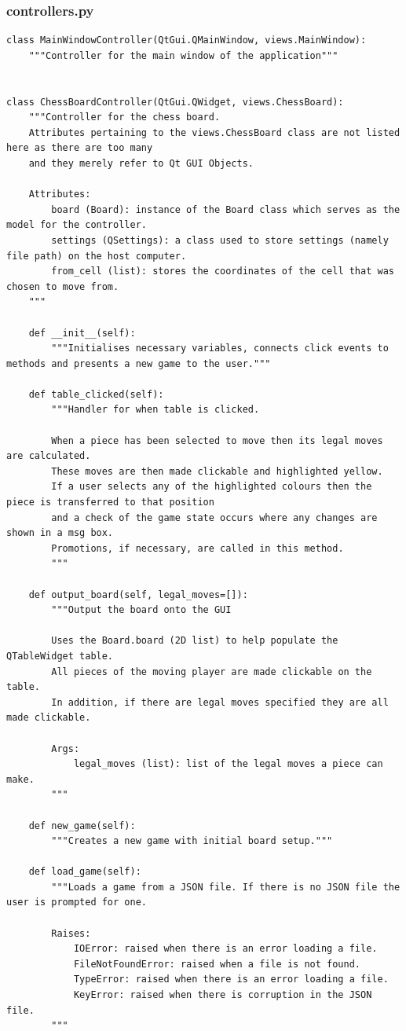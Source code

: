 \subsubsection{controllers.py}
\begin{verbatim}
class MainWindowController(QtGui.QMainWindow, views.MainWindow):
	"""Controller for the main window of the application"""


class ChessBoardController(QtGui.QWidget, views.ChessBoard):
	"""Controller for the chess board.
	Attributes pertaining to the views.ChessBoard class are not listed here as there are too many
	and they merely refer to Qt GUI Objects.

	Attributes:
		board (Board): instance of the Board class which serves as the model for the controller.
		settings (QSettings): a class used to store settings (namely file path) on the host computer.
		from_cell (list): stores the coordinates of the cell that was chosen to move from.
	"""
	
	def __init__(self):
		"""Initialises necessary variables, connects click events to methods and presents a new game to the user."""
		
	def table_clicked(self):
		"""Handler for when table is clicked.
	
		When a piece has been selected to move then its legal moves are calculated.
		These moves are then made clickable and highlighted yellow.
		If a user selects any of the highlighted colours then the piece is transferred to that position
		and a check of the game state occurs where any changes are shown in a msg box.
		Promotions, if necessary, are called in this method.
		"""
		
 	def output_board(self, legal_moves=[]):
		"""Output the board onto the GUI
	
		Uses the Board.board (2D list) to help populate the QTableWidget table.
		All pieces of the moving player are made clickable on the table.
		In addition, if there are legal moves specified they are all made clickable.

		Args:
			legal_moves (list): list of the legal moves a piece can make.
		"""
	
 	def new_game(self):
		"""Creates a new game with initial board setup."""
	
 	def load_game(self):
		"""Loads a game from a JSON file. If there is no JSON file the user is prompted for one.
	
		Raises:
			IOError: raised when there is an error loading a file.
			FileNotFoundError: raised when a file is not found.
			TypeError: raised when there is an error loading a file.
			KeyError: raised when there is corruption in the JSON file.
		"""
	

\end{verbatim}
